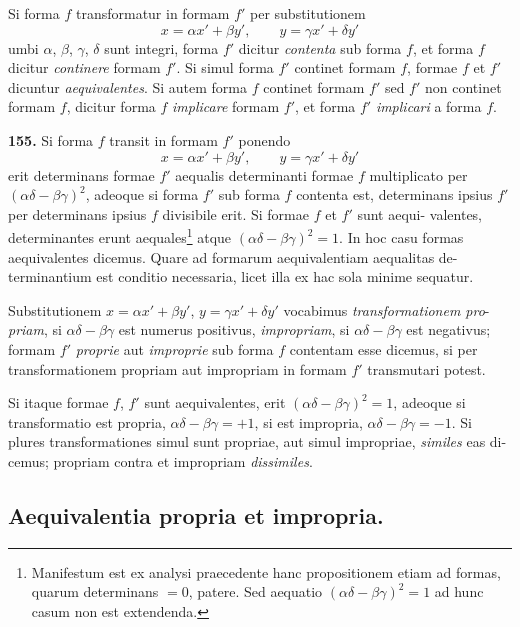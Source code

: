 \documentclass[12pt,a4paper]{article}
\begin{document}
Si forma $f$ transformatur in formam $f'$ per substitutionem
\[
x = \alpha x' + \beta y', \qquad y = \gamma x' + \delta y'
\]
umbi $\alpha$, $\beta$, $\gamma$, $\delta$ sunt integri, forma $f'$ dicitur \textit{contenta} sub forma $f$, et forma
$f$ dicitur \textit{continere} formam $f'$. Si simul forma $f'$ continet formam $f$, formae
$f$ et $f'$ dicuntur \textit{aequivalentes}. Si autem forma $f$ continet formam $f'$ sed $f'$
non continet formam $f$, dicitur forma $f$ \textit{implicare} formam $f'$, et forma $f'$ \textit{implicari}
a forma $f$.

\textbf{155.}
Si forma $f$ transit in formam $f'$ ponendo
\[
x = \alpha x' + \beta y', \qquad y = \gamma x' + \delta y'
\]
erit determinans formae $f'$ aequalis determinanti formae $f$ multiplicato per
$(\alpha\delta - \beta\gamma)^2$, adeoque si forma $f'$ sub forma $f$ contenta est, determinans
ipsius $f'$ per determinans ipsius $f$ divisibile erit. Si formae $f$ et $f'$ sunt aequi-
valentes, determinantes erunt aequales\footnote{Manifestum est ex analysi praecedente hanc propositionem etiam ad formas, quarum determinans $= 0$, patere. Sed aequatio $(\alpha\delta - \beta\gamma)^2 = 1$ ad hunc casum non est extendenda.} atque $(\alpha\delta - \beta\gamma)^2 = 1$. In hoc casu
formas aequivalentes dicemus. Quare ad formarum aequivalentiam aequalitas de-
terminantium est conditio necessaria, licet illa ex hac sola minime sequatur.

Substitutionem $x = \alpha x' + \beta y'$, $y = \gamma x' + \delta y'$ vocabimus \textit{transformationem pro}-
\textit{priam}, si $\alpha\delta - \beta\gamma$ est numerus positivus, \textit{impropriam}, si $\alpha\delta - \beta\gamma$ est negativus;
formam $f'$ \textit{proprie} aut \textit{improprie} sub forma $f$ contentam esse dicemus, si
per transformationem propriam aut impropriam in formam $f'$ transmutari potest.

Si itaque formae $f$, $f'$ sunt aequivalentes, erit $(\alpha\delta - \beta\gamma)^2 = 1$, adeoque si
transformatio est propria, $\alpha\delta - \beta\gamma = +1$, si est impropria, $\alpha\delta - \beta\gamma = -1$. Si
plures transformationes simul sunt propriae, aut simul impropriae, \textit{similes} eas di-
cemus; propriam contra et impropriam \textit{dissimiles}.

\subsection*{Aequivalentia propria et impropria.}
\end{document}
